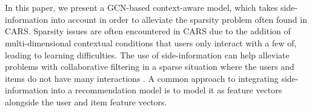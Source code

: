 \\\\
In this paper, we present a GCN-based context-aware model, which takes side-information into account in order to alleviate the sparsity problem often found in CARS.
Sparsity issues are often encountered in CARS due to the addition of multi-dimensional contextual conditions that users only interact with a few of\cite{SparsityCARS}, leading to learning difficulties.
The use of side-information can help alleviate problems with collaborative filtering in a sparse situation where the users and items do not have many interactions \cite{KGAT}. 
A common approach to integrating side-information into a recommendation model is to model it as feature vectors alongside the user and item feature vectors.

